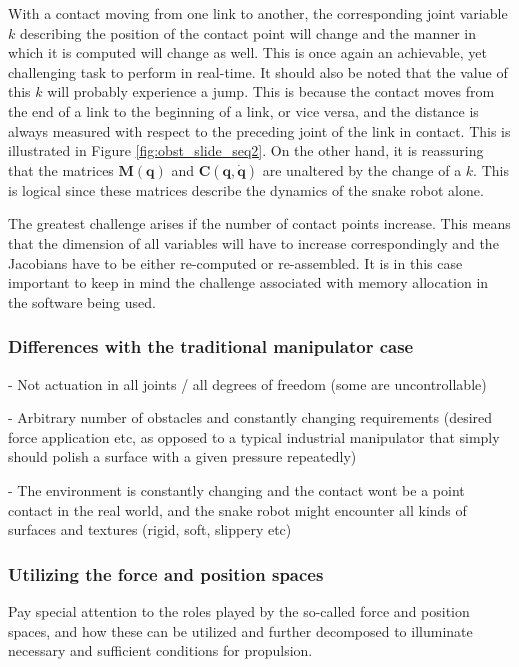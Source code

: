 With a contact moving from one link to another, the corresponding joint variable $k$ describing the position of the contact point will change and the manner in which it is computed will change as well. This is once again an achievable, yet challenging task to perform in real-time. It should also be noted that the value of this $k$ will probably experience a jump. This is because the contact moves from the end of a link to the beginning of a link, or vice versa, and the distance is always measured with respect to the preceding joint of the link in contact. This is illustrated in Figure \ref{fig:obst_slide_seq2}. On the other hand, it is reassuring that the matrices $\mathbf{M(q)}$ and $\mathbf{C(q,\dot{q})}$ are unaltered by the change of a $k$. This is logical since these matrices describe the dynamics of the snake robot alone.

The greatest challenge arises if the number of contact points increase. This means that the dimension of all variables will have to increase correspondingly and the Jacobians have to be either re-computed or re-assembled. It is in this case important to keep in mind the challenge associated with memory allocation in the software being used.

\subsubsection{Differences with the traditional manipulator case}

- Not actuation in all joints / all degrees of freedom (some are uncontrollable)

- Arbitrary number of obstacles and constantly changing requirements (desired force application etc, as opposed to a typical industrial manipulator that simply should polish a surface with a given pressure repeatedly)

- The environment is constantly changing and the contact wont be a point contact in the real world, and the snake robot might encounter all kinds of surfaces and textures (rigid, soft, slippery etc)

\subsubsection{Utilizing the force and position spaces}

Pay special attention to the
roles played by the so-called force and position spaces, and how these can be utilized and further
decomposed to illuminate necessary and sufficient conditions for propulsion.





